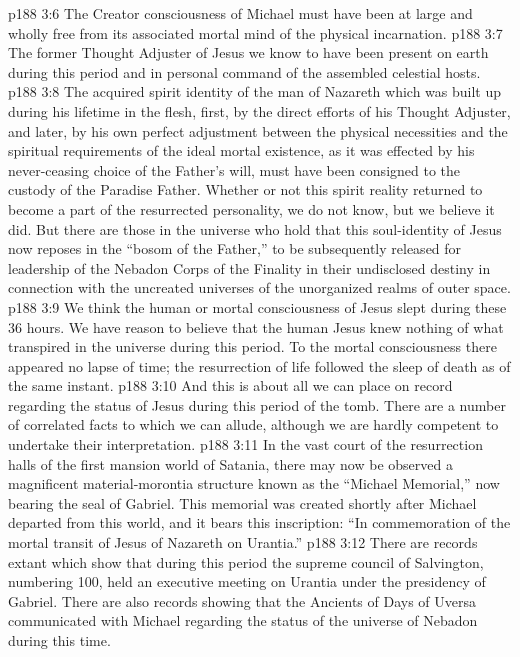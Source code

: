 \vs p188 3:6 \bibnobreakspace The Creator consciousness of Michael must have been at large and wholly free from its associated mortal mind of the physical incarnation.
\vs p188 3:7 \bibnobreakspace The former Thought Adjuster of Jesus we know to have been present on earth during this period and in personal command of the assembled celestial hosts.
\vs p188 3:8 \bibnobreakspace The acquired spirit identity of the man of Nazareth which was built up during his lifetime in the flesh, first, by the direct efforts of his Thought Adjuster, and later, by his own perfect adjustment between the physical necessities and the spiritual requirements of the ideal mortal existence, as it was effected by his never\hyp{}ceasing choice of the Father’s will, must have been consigned to the custody of the Paradise Father. Whether or not this spirit reality returned to become a part of the resurrected personality, we do not know, but we believe it did. But there are those in the universe who hold that this soul\hyp{}identity of Jesus now reposes in the “bosom of the Father,” to be subsequently released for leadership of the Nebadon Corps of the Finality in their undisclosed destiny in connection with the uncreated universes of the unorganized realms of outer space.
\vs p188 3:9 \bibnobreakspace We think the human or mortal consciousness of Jesus slept during these 36 hours. We have reason to believe that the human Jesus knew nothing of what transpired in the universe during this period. To the mortal consciousness there appeared no lapse of time; the resurrection of life followed the sleep of death as of the same instant.
\vs p188 3:10 \pc And this is about all we can place on record regarding the status of Jesus during this period of the tomb. There are a number of correlated facts to which we can allude, although we are hardly competent to undertake their interpretation.
\vs p188 3:11 In the vast court of the resurrection halls of the first mansion world of Satania, there may now be observed a magnificent material\hyp{}morontia structure known as the “Michael Memorial,” now bearing the seal of Gabriel. This memorial was created shortly after Michael departed from this world, and it bears this inscription: “In commemoration of the mortal transit of Jesus of Nazareth on Urantia.”
\vs p188 3:12 There are records extant which show that during this period the supreme council of Salvington, numbering 100, held an executive meeting on Urantia under the presidency of Gabriel. There are also records showing that the Ancients of Days of Uversa communicated with Michael regarding the status of the universe of Nebadon during this time.
